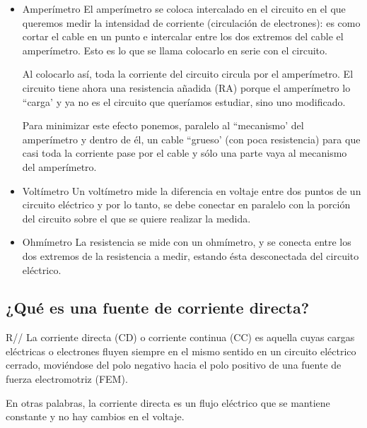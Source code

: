 \documentclass[letterpaper, 12pt]{report}
\begin{document}
\begin{itemize}
	\item Amperímetro \hfill \break{}
	      El amperímetro se coloca intercalado en el circuito en el que queremos
	      medir la intensidad de corriente (circulación de electrones): es como
	      cortar el cable en un punto e intercalar entre los dos extremos del
	      cable el amperímetro. Esto es lo que se llama colocarlo en serie
	      con el circuito.

	      Al colocarlo así, toda la corriente del circuito circula por el
	      amperímetro. El circuito tiene ahora una resistencia añadida (RA)
	      porque el amperímetro lo ``carga' y ya no es el circuito que queríamos
	      estudiar, sino uno modificado.

	      Para minimizar este efecto ponemos, paralelo al ``mecanismo' del
	      amperímetro y dentro de él, un cable ``grueso' (con poca resistencia)
	      para que casi toda la corriente pase por el cable y sólo una parte
	      vaya al mecanismo del amperímetro.~\cite{Amperimetro}

	\item Voltímetro \hfill \break{}
	      Un voltímetro mide la diferencia en voltaje entre dos puntos de un
	      circuito eléctrico y por lo tanto, se debe conectar en paralelo con
	      la porción del circuito sobre el que se quiere realizar
	      la medida.~\cite{Voltimetro}

	\item Ohmímetro \hfill \break{}
	      La resistencia se mide con un ohmímetro, y se conecta entre los dos
	      extremos de la resistencia a medir, estando ésta desconectada
	      del circuito eléctrico.~\cite{Ohmimetro}
\end{itemize}

\subsection{¿Qué es una fuente de corriente directa?}

R// La corriente directa (CD) o corriente continua (CC) es aquella cuyas
cargas eléctricas o electrones fluyen siempre en el mismo sentido en un
circuito eléctrico cerrado, moviéndose del polo negativo hacia el polo
positivo de una fuente de fuerza electromotriz (FEM).

\vspace{.5cm}

En otras palabras, la corriente directa es un flujo eléctrico que se mantiene
constante y no hay cambios en el voltaje.~\cite{CorrienteContinua}
\end{document}
